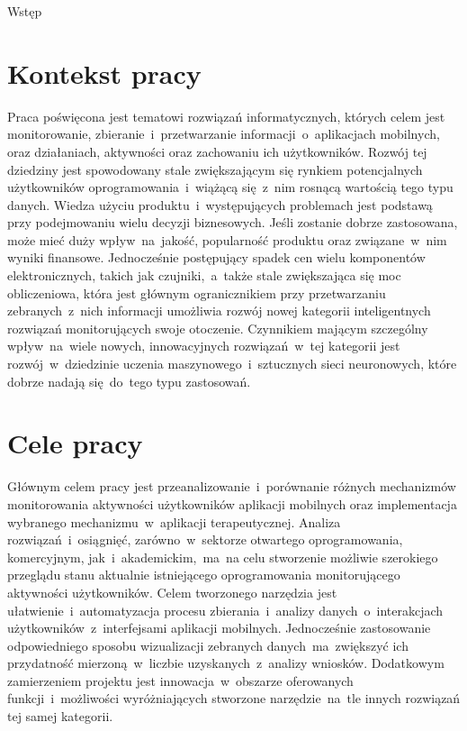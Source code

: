 \begin{chapter}{Wstęp}
	\newcommand{\chapterPath}{chapters/Introduction}

	\section{Kontekst pracy}
	Praca poświęcona jest tematowi rozwiązań informatycznych, których celem jest monitorowanie, zbieranie~i~przetwarzanie informacji~o~aplikacjach mobilnych, oraz działaniach, aktywności oraz zachowaniu ich użytkowników. Rozwój tej dziedziny jest spowodowany stale zwiększającym się rynkiem potencjalnych użytkowników oprogramowania~i~wiążącą się~z~nim rosnącą wartością tego typu danych. Wiedza użyciu produktu~i~występujących problemach jest podstawą przy podejmowaniu wielu decyzji biznesowych. Jeśli zostanie dobrze zastosowana, może mieć duży wpływ~na~jakość, popularność produktu oraz związane~w~nim wyniki finansowe. Jednocześnie postępujący spadek cen wielu komponentów elektronicznych, takich jak czujniki,~a~także stale zwiększająca się moc obliczeniowa, która jest głównym ogranicznikiem  przy przetwarzaniu zebranych~z~nich informacji umożliwia rozwój nowej kategorii inteligentnych rozwiązań monitorujących swoje otoczenie. Czynnikiem mającym szczególny wpływ~na~wiele nowych, innowacyjnych rozwiązań~w~tej kategorii jest rozwój~w~dziedzinie uczenia maszynowego~i~sztucznych sieci neuronowych, które dobrze nadają się~do~tego typu zastosowań.
	
	\section{Cele pracy}
	Głównym celem pracy jest przeanalizowanie~i~porównanie różnych mechanizmów monitorowania aktywności użytkowników aplikacji mobilnych oraz implementacja wybranego mechanizmu~w~aplikacji terapeutycznej. Analiza rozwiązań~i~osiągnięć, zarówno~w~sektorze otwartego oprogramowania, komercyjnym, jak~i~akademickim,~ma~na celu stworzenie możliwie szerokiego przeglądu stanu aktualnie istniejącego oprogramowania monitorującego aktywności użytkowników. Celem tworzonego narzędzia jest ułatwienie~i~automatyzacja procesu zbierania~i~analizy danych~o~interakcjach użytkowników~z~interfejsami aplikacji mobilnych. Jednocześnie zastosowanie odpowiedniego sposobu wizualizacji zebranych danych~ma~zwiększyć ich przydatność mierzoną~w~liczbie uzyskanych~z~analizy wniosków. Dodatkowym zamierzeniem projektu jest innowacja~w~obszarze oferowanych funkcji~i~możliwości wyróżniających stworzone narzędzie~na~tle innych rozwiązań tej samej kategorii.
	

\end{chapter}
